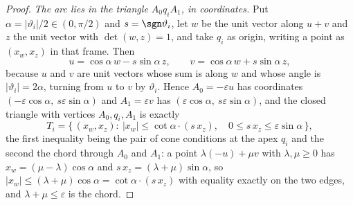 \begin{proof}
\emph{The arc lies in the triangle $A_0q_iA_1$, in coordinates.} Put
$\alpha=|\vartheta_i|/2\in(0,\pi/2)$ and $s=\sgn\vartheta_i$, let $w$ be the unit vector
along $u+v$ and $z$ the unit vector with $\det(w,z)=1$, and take $q_i$ as
origin, writing a point as $(x_w,x_z)$ in that frame. Then
\[
   u=\cos\alpha\,w-s\sin\alpha\,z,
   \qquad
   v=\cos\alpha\,w+s\sin\alpha\,z,
\]
because $u$ and $v$ are unit vectors whose sum is along $w$ and whose angle is
$|\vartheta_i|=2\alpha$, turning from $u$ to $v$ by $\vartheta_i$. Hence
$A_0=-\varepsilon u$ has coordinates $(-\varepsilon\cos\alpha,\ s\varepsilon
\sin\alpha)$ and $A_1=\varepsilon v$ has $(\varepsilon\cos\alpha,\
s\varepsilon\sin\alpha)$, and the closed triangle with vertices $A_0,q_i,A_1$
is exactly
\begin{equation}
   T_i=\bigl\{\,(x_w,x_z):\ |x_w|\leq\cot\alpha\cdot(s\,x_z),
   \quad 0\leq s\,x_z\leq\varepsilon\sin\alpha\,\bigr\},
\label{cf:eq-triangle}
\end{equation}
the first inequality being the pair of cone conditions at the apex $q_i$ and the
second the chord through $A_0$ and $A_1$: a point $\lambda(-u)+\mu v$ with
$\lambda,\mu\geq0$ has $x_w=(\mu-\lambda)\cos\alpha$ and
$s\,x_z=(\lambda+\mu)\sin\alpha$, so $|x_w|\leq(\lambda+\mu)\cos\alpha=\cot\alpha
\cdot(s\,x_z)$ with equality exactly on the two edges, and $\lambda+\mu\leq
\varepsilon$ is the chord.


\end{proof}
